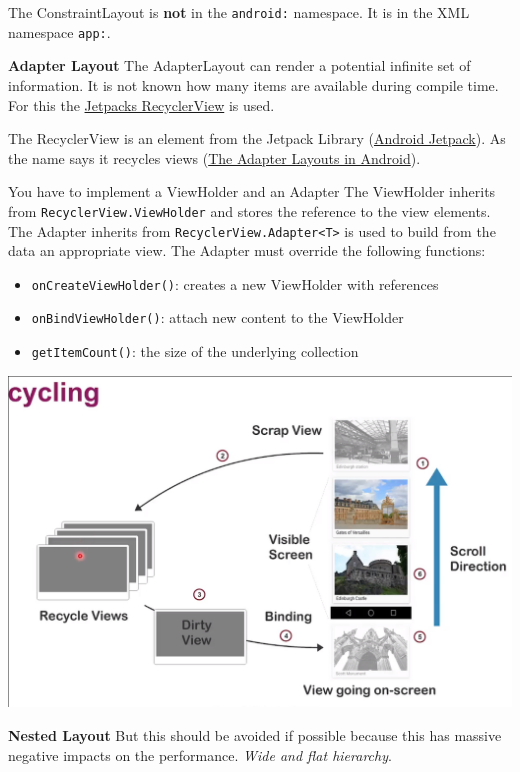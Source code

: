 \documentclass[11pt,twoside,landscape]{article}
\begin{document}
\begin{multicols}{3}
The ConstraintLayout is \textbf{not} in the \texttt{android:} namespace.
It is in the XML namespace \texttt{app:}. 


\textbf{Adapter Layout}
The AdapterLayout can render a potential infinite set of information.
It is not known how many items are available during compile time.
For this the \href{../../../roam/20211017144845-jetpacks_recyclerview.org}{Jetpacks RecyclerView} is used.

The RecyclerView is an element from the Jetpack Library (\href{../../../roam/20211112094119-android_jetpack.org}{Android Jetpack}).
As the name says it recycles views (\href{../../../roam/20211017133835-the_adapter_layouts_in_android.org}{The Adapter Layouts in Android}).

You have to implement a ViewHolder and an Adapter
The ViewHolder inherits from \texttt{RecyclerView.ViewHolder} and stores the reference to the view elements.
The Adapter inherits from \texttt{RecyclerView.Adapter<T>} is used to build from the data an appropriate view.
The Adapter must override the following functions:
\begin{itemize}
\item \texttt{onCreateViewHolder()}: creates a new ViewHolder with references
\item \texttt{onBindViewHolder()}: attach new content to the ViewHolder
\item \texttt{getItemCount()}: the size of the underlying collection
\end{itemize}


\begin{center}
\includegraphics[width=.9\linewidth]{img/view_recycling.png}
\end{center}

\textbf{Nested Layout}
But this should be avoided if possible because this has massive negative impacts on the performance.
\emph{Wide and flat hierarchy}.


\end{multicols}
\end{document}
